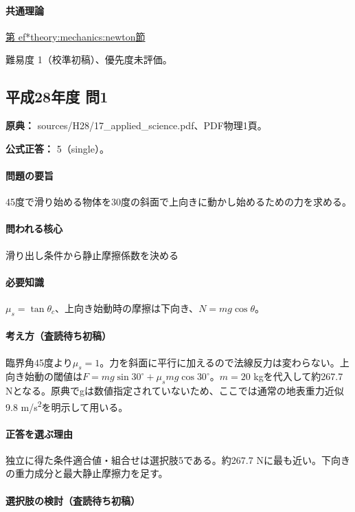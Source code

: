 \paragraph{共通理論} \hyperref[theory:mechanics:newton]{第
ef*{theory:mechanics:newton}節}

\par 難易度 1（校準初稿）、優先度未評価。

\subsection{平成28年度 問1}
\label{q:h28-reg-applied-01}

\noindent\textbf{原典：} sources/H28/17\_applied\_science.pdf、PDF物理1頁。

\textbf{公式正答：} 5（single）。

\paragraph{問題の要旨} 45度で滑り始める物体を30度の斜面で上向きに動かし始めるための力を求める。

\paragraph{問われる核心} 滑り出し条件から静止摩擦係数を決める

\paragraph{必要知識} \(\mu_s=\tan\theta_c\)、上向き始動時の摩擦は下向き、\(N=mg\cos\theta\)。

\paragraph{考え方（査読待ち初稿）} 臨界角45度より\(\mu_s=1\)。力を斜面に平行に加えるので法線反力は変わらない。上向き始動の閾値は\(F=mg\sin30^\circ+\mu_smg\cos30^\circ\)。\(m=20\) kgを代入して約267.7 Nとなる。原典でgは数値指定されていないため、ここでは通常の地表重力近似9.8 m/s\textsuperscript{2}を明示して用いる。

\paragraph{正答を選ぶ理由} 独立に得た条件適合値・組合せは選択肢5である。約267.7 Nに最も近い。下向きの重力成分と最大静止摩擦力を足す。

\paragraph{選択肢の検討（査読待ち初稿）}

